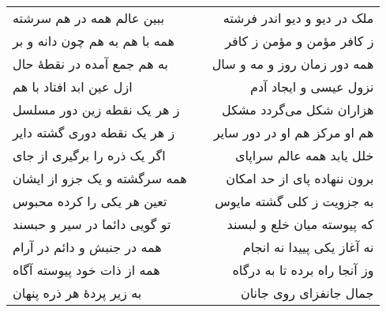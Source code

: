 \begin{center}
\begin{longtable}{l p{0.5cm} r}
ببین عالم همه در هم سرشته
&&
ملک در دیو و دیو اندر فرشته
\\
همه با هم به هم چون دانه و بر
&&
ز کافر مؤمن و مؤمن ز کافر
\\
به هم جمع آمده در نقطهٔ حال
&&
همه دور زمان روز و مه و سال
\\
ازل عین ابد افتاد با هم
&&
نزول عیسی و ایجاد آدم
\\
ز هر یک نقطه زین دور مسلسل
&&
هزاران شکل می‌گردد مشکل
\\
ز هر یک نقطه دوری گشته دایر
&&
هم او مرکز هم او در دور سایر
\\
اگر یک ذره را برگیری از جای
&&
خلل یابد همه عالم سراپای
\\
همه سرگشته و یک جزو از ایشان
&&
برون ننهاده پای از حد امکان
\\
تعین هر یکی را کرده محبوس
&&
به جزویت ز کلی گشته مایوس
\\
تو گویی دائما در سیر و حبسند
&&
که پیوسته میان خلع و لبسند
\\
همه در جنبش و دائم در آرام
&&
نه آغاز یکی پییدا نه انجام
\\
همه از ذات خود پیوسته آگاه
&&
وز آنجا راه برده تا به درگاه
\\
به زیر پردهٔ هر ذره پنهان
&&
جمال جانفزای روی جانان
\\
\end{longtable}
\end{center}
